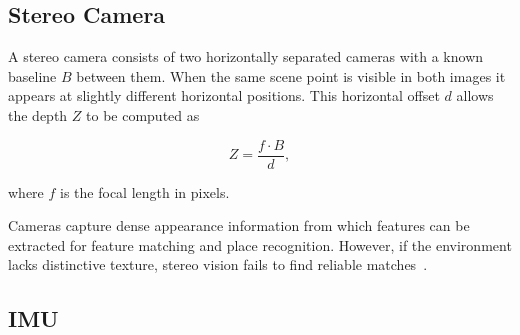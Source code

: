 \subsection{Stereo Camera}

A stereo camera consists of two horizontally separated cameras with a known
baseline $B$ between them.
When the same scene point is visible in both images it appears at slightly
different horizontal positions. This horizontal offset $d$ allows the depth $Z$ to 
be computed as

\begin{equation}
  Z = \frac{f \cdot B}{d},
  \label{eq:stereo_depth}
\end{equation}

\noindent where $f$ is the focal length in pixels.

Cameras capture dense appearance information from which features can be
extracted for feature matching and place recognition.
However, if the environment lacks distinctive texture, stereo vision fails
to find reliable matches~\cite[p.~113]{siegwart2004introduction}.


%
\subsection{IMU}

